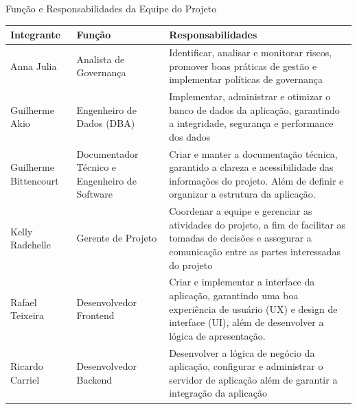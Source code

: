 \documentclass[
	12pt,				%
	openany,			%
	twoside,			%
	a4paper,			%
	english,			%
	french,				%
	spanish,			%
	brazil				%
	]{abntex2}
\begin{document}
\begin{quadro}[htb]
	\caption{Função e Responsabilidades da Equipe do Projeto}
	\label{quadro_funçao_responsabilidade}
	\begin{tabular}{|p{2.8cm}|p{5cm}|p{7.2cm}|}
		\hline
		\textbf{Integrante} & \textbf{Função} & \textbf{Responsabilidades} \\ \hline
		Anna Julia & Analista de Governança & Identificar, analisar e monitorar riscos, promover boas práticas de gestão e implementar políticas de governança \\ \hline
	
		Guilherme Akio & Engenheiro de Dados (DBA) & Implementar, administrar  e otimizar o banco de dados da aplicação, garantindo a integridade, segurança e performance dos dados \\ \hline
	
		Guilherme \quad Bittencourt & Documentador Técnico e Engenheiro de Software & Criar e manter a documentação técnica, garantido a clareza e acessibilidade das informações do projeto. Além de definir e organizar a estrutura da aplicação.\\ \hline
	
		Kelly Radchelle & Gerente de Projeto & Coordenar a equipe e gerenciar as atividades  do projeto, a fim de facilitar as tomadas de decisões e  assegurar a comunicação entre as partes interessadas do projeto   \\ \hline
		Rafael Teixeira & Desenvolvedor Frontend & Criar e implementar a interface da aplicação, garantindo uma boa  experiência de usuário (UX)  e design de interface (UI), além de desenvolver a lógica de apresentação.    \\ \hline
		Ricardo Carriel & Desenvolvedor Backend & Desenvolver a lógica de negócio da aplicação, configurar e administrar o servidor de aplicação  além de garantir a integração da aplicação  \\ \hline
	\end{tabular}
\end{quadro}
\end{document}
